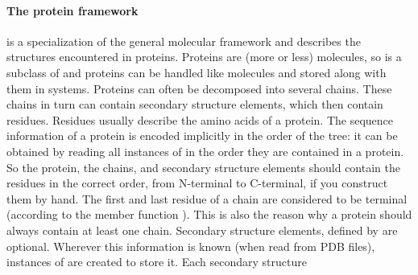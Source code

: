 \paragraph{The protein framework} is a specialization of the general molecular
framework and describes the structures encountered in proteins. Proteins are
(more or less) molecules, so  is a subclass of 
and proteins can be handled like molecules and stored along with them in
systems. Proteins can often be decomposed into several chains. These chains in
turn can contain secondary structure elements, which then contain residues.
Residues usually describe the amino acids of a protein. The sequence
information of a protein is encoded implicitly in the order of the tree: it
can be obtained by reading all instances of  in the order they
are contained in a protein. So the protein, the chains, and secondary
structure elements should contain the residues in the correct order, from
N-terminal to C-terminal, if you construct them by hand. The first and last
residue of a chain are considered to be terminal (according to the member
function ). This is also the reason why a protein
should always contain at least one chain. Secondary structure elements,
defined by  are optional. Wherever this information
is known (\eg when read from PDB files), instances of
 are created to store it. Each secondary structure
